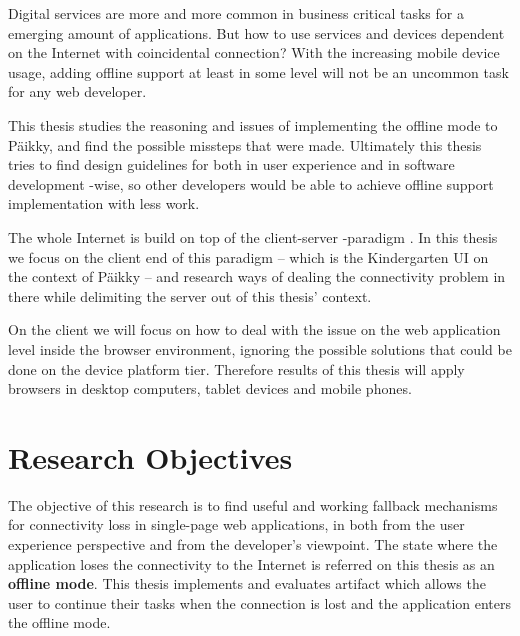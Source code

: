 Digital services are more and more common in business critical tasks for a emerging amount of applications. But how to use services and devices dependent on the Internet with coincidental connection? With the increasing mobile device usage, adding offline support at least in some level will not be an uncommon task for any web developer.

This thesis studies the reasoning and issues of implementing the offline mode to Päikky, and find the possible missteps that were made. Ultimately this thesis tries to find design guidelines for both in user experience and in software development -wise, so other developers would be able to achieve offline support implementation with less work.

The whole Internet is build on top of the client-server -paradigm \cite{berson_client-server_1992}. In this thesis we focus on the client end of this paradigm -- which is the Kindergarten UI on the context of Päikky -- and research ways of dealing the connectivity problem in there while delimiting the server out of this thesis' context. 

On the client we will focus on how to deal with the issue on the web application level inside the browser environment, ignoring the possible solutions that could be done on the device platform tier. Therefore results of this thesis will apply browsers in desktop computers, tablet devices and mobile phones.






\section{Research Objectives}
The objective of this research is to find useful and working fallback mechanisms for connectivity loss in single-page web applications, in both from the user experience perspective and from the developer's viewpoint. The state where the application loses the connectivity to the Internet is referred on this thesis as an \textbf{offline mode}. This thesis implements and evaluates artifact which allows the user to continue their tasks when the connection is lost and the application enters the offline mode.

